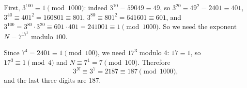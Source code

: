 First, $3^{100}\equiv1\pmod{1000}$: indeed $3^{10}=59049\equiv49$, so $3^{20}\equiv49^2=2401\equiv401$, $3^{40}\equiv401^2=160801\equiv801$, $3^{80}\equiv801^2=641601\equiv601$, and $3^{100}=3^{80}\cdot3^{20}\equiv601\cdot401=241001\equiv1\pmod{1000}$. So we need the exponent $N=7^{17^3}$ modulo $100$.

Since $7^4=2401\equiv1\pmod{100}$, we need $17^3$ modulo $4$: $17\equiv1$, so $17^3\equiv1\pmod4$ and $N\equiv7^1=7\pmod{100}$. Therefore
\[3^{N}\equiv3^7=2187\equiv187\pmod{1000},\]
and the last three digits are $\boxed{187}$.
